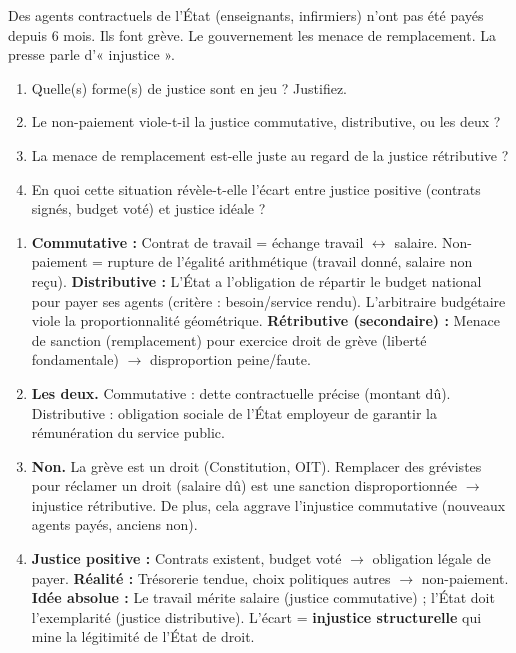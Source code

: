 \documentclass[11pt]{article}
\begin{document}
\begin{exercice}
Des agents contractuels de l'État (enseignants, infirmiers) n'ont pas été payés depuis 6 mois. Ils font grève. Le gouvernement les menace de remplacement. La presse parle d'« injustice ».
\begin{enumerate}
    \item Quelle(s) forme(s) de justice sont en jeu ? Justifiez.
    \item Le non-paiement viole-t-il la justice commutative, distributive, ou les deux ?
    \item La menace de remplacement est-elle juste au regard de la justice rétributive ?
    \item En quoi cette situation révèle-t-elle l'écart entre justice positive (contrats signés, budget voté) et justice idéale ?
\end{enumerate}
\end{exercice}

\begin{corrige}
\begin{enumerate}
    \item \textbf{Commutative :} Contrat de travail = échange travail $\leftrightarrow$ salaire. Non-paiement = rupture de l'égalité arithmétique (travail donné, salaire non reçu). \textbf{Distributive :} L'État a l'obligation de répartir le budget national pour payer ses agents (critère : besoin/service rendu). L'arbitraire budgétaire viole la proportionnalité géométrique. \textbf{Rétributive (secondaire) :} Menace de sanction (remplacement) pour exercice droit de grève (liberté fondamentale) $\to$ disproportion peine/faute.
    \item \textbf{Les deux.} Commutative : dette contractuelle précise (montant dû). Distributive : obligation sociale de l'État employeur de garantir la rémunération du service public.
    \item \textbf{Non.} La grève est un droit (Constitution, OIT). Remplacer des grévistes pour réclamer un droit (salaire dû) est une sanction disproportionnée $\to$ injustice rétributive. De plus, cela aggrave l'injustice commutative (nouveaux agents payés, anciens non).
    \item \textbf{Justice positive :} Contrats existent, budget voté $\to$ obligation légale de payer. \textbf{Réalité :} Trésorerie tendue, choix politiques autres $\to$ non-paiement. \textbf{Idée absolue :} Le travail mérite salaire (justice commutative) ; l'État doit l'exemplarité (justice distributive). L'écart = \textbf{injustice structurelle} qui mine la légitimité de l'État de droit.
\end{enumerate}
\end{corrige}
\end{document}
